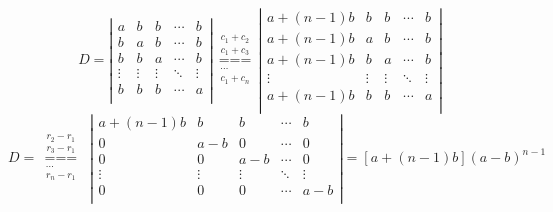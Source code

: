 $$
D=\left| \begin{matrix}
a & b & b & \cdots  & b  \\
b & a & b & \cdots  & b  \\
b & b & a & \cdots  & b  \\
\vdots  & \vdots  & \vdots  & \ddots & \vdots   \\
b & b & b & \cdots  & a  \\
\end{matrix} \right|
\underset{\begin{smallmatrix} 
\cdots  \\ 
{{c}_{1}}+{{c}_{n}} 
\end{smallmatrix}}{\overset{\begin{smallmatrix} 
{{c}_{1}}+{{c}_{2}} \\ 
{{c}_{1}}+{{c}_{3}} 
\end{smallmatrix}}{\mathop{===}}}  
\left| \begin{matrix}
a+(n-1)b & b & b    & \cdots  & b  \\
a+(n-1)b & a & b    & \cdots  & b  \\
a+(n-1)b & b & a    & \cdots  & b  \\
\vdots   & \vdots   & \vdots  & \ddots & \vdots   \\
a+(n-1)b & b & b    & \cdots  & a  \\
\end{matrix} \right| 
$$$$
D=\underset{\begin{smallmatrix} 
\cdots  \\ 
{{r}_{n}}-{{r}_{1}} 
\end{smallmatrix}}{\overset{\begin{smallmatrix} 
{{r}_{2}}-{{r}_{1}} \\ 
{{r}_{3}}-{{r}_{1}} 
\end{smallmatrix}}{\mathop{===}}}\,\ \left| \begin{matrix}
    a+(n-1)b & b & b & \cdots  & b  \\
    0 & a-b & 0 & \cdots  & 0  \\
    0 & 0 & a-b & \cdots  & 0  \\
    \vdots  & \vdots  & \vdots  & \ddots & \vdots   \\
    0 & 0 & 0 & \cdots  & a-b  \\
\end{matrix} \right|
=[a+(n-1)b]{{(a-b)}^{n-1}}
$$
